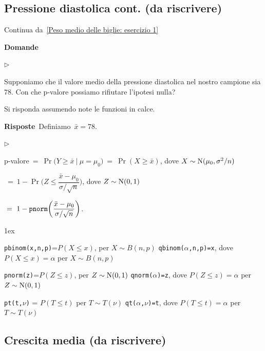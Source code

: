 \documentclass[11pt,openany]{book}
\newcommand{\mylabel}[1]{{\footnotesize\textsf{#1}}\hfill}
\renewenvironment{itemize}
  {\begin{list}{$\triangleright$}{%
   \setlength{\parskip}{0mm}
   \setlength{\topsep}{.2\baselineskip}
   \setlength{\rightmargin}{0mm}
   \setlength{\listparindent}{0mm}
   \setlength{\itemindent}{0mm}
   \setlength{\labelwidth}{3ex}
   \setlength{\itemsep}{.4\baselineskip}
   \setlength{\parsep}{0mm}
   \setlength{\partopsep}{0mm}
   \setlength{\labelsep}{1ex}
   \setlength{\leftmargin}{\labelwidth+\labelsep}
   \let\makelabel\mylabel}}{%
   \end{list}\vspace*{-1.3mm}}
\begin{document}
\clearpage\subsection{Pressione diastolica cont. (da riscrivere)}
\label{Pressione diastolica esercizio 2}

Continua da~\ref{Peso medio delle biglie: esercizio 1}

\textbf{Domande}

\begin{itemize}
\item[6.] Supponiamo che il valore medio della pressione diastolica nel nostro campione sia $78$. 
Con che p-valore possiamo rifiutare l'ipotesi nulla?
\end{itemize}
Si risponda assumendo note le funzioni in calce.

\textbf{Risposte}\  Definiamo\ $\bar x=78$.\medskip

\begin{itemize}
\item[6.] 

p-valore$\ =\ \Pr\big(Y\ge \bar x\ \mathbin\big|\ \mu=\mu_0\big)\ =\ \Pr(X\ge\bar x)$, dove $X\sim {\rm N}(\mu_0,\sigma^2/n)$\medskip\smallskip

\phantom{p-valore}$\ =\ 1-\Pr\bigg(Z\le \dfrac{\bar x-\mu_0}{\sigma/\sqrt n}\bigg)$, dove $Z\sim {\rm N}(0,1)$\medskip

\phantom{p-valore}$\ =\ 1- {\tt pnorm}\bigg(\dfrac{\bar x-\mu_0}{\sigma/\sqrt n}\bigg)$.

\end{itemize}

\vfill
\parskip1ex
{\hrulefill\scriptsize

{\tt pbinom(x,n,p)}=$P(X\le x)$, per $X\sim B(n,p)$
\hfill 
{\tt qbinom($\alpha$,n,p)=x},  dove $P(X\le x)=\alpha$ per $X\sim B(n,p)$

{\tt pnorm(z)}=$P(Z\le z)$, per $Z\sim {\rm N}(0,1)$
\hfill 
{\tt qnorm($\alpha$)=z},  dove $P(Z\le z)=\alpha$ per $Z\sim {\rm N}(0,1)$

{\tt pt(t,$\nu$)} = $P(T\le t)$ per $T\sim T(\nu)$
\hfill
{\tt qt($\alpha$,$\nu$)=t}, dove $P(T\le t)=\alpha$ per $T\sim T(\nu)$

}

\clearpage\subsection{Crescita media (da riscrivere)}
\end{document}
